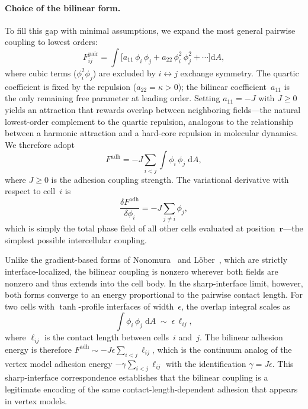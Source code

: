 \documentclass[aps,pre,twocolumn,superscriptaddress,longbibliography]{revtex4-2}
\newcommand{\dd}{\mathrm{d}}               %
\newcommand{\phii}{\phi_i}                 %
\newcommand{\phij}{\phi_j}                 %
\begin{document}
\paragraph{Choice of the bilinear form.}
To fill this gap with minimal assumptions, we expand the most general
pairwise coupling to lowest orders:
%
\begin{equation}
  F^{\mathrm{pair}}_{ij}
    = \int\!\bigl[
        a_{11}\,\phii\,\phij
        + a_{22}\,\phii^2\,\phij^2
        + \cdots
      \bigr]\dd A,
  \label{eq:landau-pair}
\end{equation}
%
where cubic terms ($\phii^2\phij$) are excluded by $i \leftrightarrow j$
exchange symmetry.  The quartic coefficient is fixed by the repulsion
($a_{22} = \kappa > 0$); the bilinear coefficient~$a_{11}$ is the only
remaining free parameter at leading order.  Setting $a_{11} = -J$ with
$J \geq 0$ yields an attraction that rewards overlap between neighboring
fields---the natural lowest-order complement to the quartic repulsion,
analogous to the relationship between a harmonic attraction and a
hard-core repulsion in molecular dynamics.  We therefore adopt
%
\begin{equation}
  F^{\mathrm{adh}} = -J\sum_{i<j}\int \phii\,\phij\;\dd A,
  \label{eq:adhesion}
\end{equation}
%
where $J \geq 0$ is the adhesion coupling strength.  The variational
derivative with respect to cell~$i$ is
%
\begin{equation}
  \frac{\delta F^{\mathrm{adh}}}{\delta \phii}
    = -J \sum_{j \neq i} \phij,
  \label{eq:adhesion-var}
\end{equation}
%
which is simply the total phase field of all other cells evaluated at
position~$\bm{r}$---the simplest possible intercellular coupling.

Unlike the gradient-based forms of Nonomura~\cite{Nonomura2012} and
L\"ober~\cite{Lober2015}, which are strictly interface-localized, the
bilinear coupling is nonzero wherever both fields are nonzero and
thus extends into the cell body.
In the sharp-interface limit, however, both forms converge to an
energy proportional to the pairwise contact length.  For two cells
with $\tanh$-profile interfaces of width~$\epsilon$, the overlap
integral scales as
%
\begin{equation}
  \int\!\phii\,\phij\;\dd A
    \;\sim\;\epsilon\,\ell_{ij},
  \label{eq:sharp-interface}
\end{equation}
%
where $\ell_{ij}$ is the contact length between cells~$i$ and~$j$.
The bilinear adhesion energy is therefore
$F^{\mathrm{adh}} \sim -J\epsilon\sum_{i<j}\ell_{ij}$,
which is the continuum analog of the vertex model adhesion energy
$-\gamma\sum_{i<j}\ell_{ij}$ with the identification
$\gamma = J\epsilon$.  This sharp-interface correspondence
establishes that the bilinear coupling is a legitimate encoding of the
same contact-length-dependent adhesion that appears in vertex models.
\end{document}
